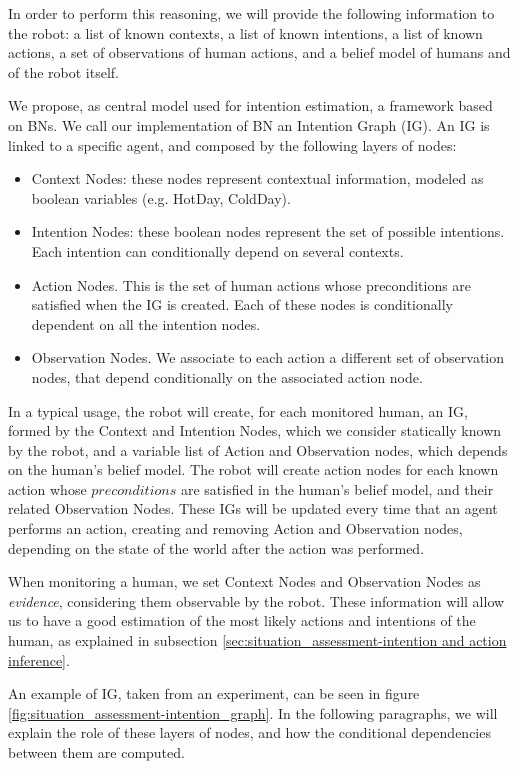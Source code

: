 In order to perform this reasoning, we will provide the following information to the robot: a list of known contexts, a list of known intentions, a list of known actions, a set of observations of human actions, and a belief model of humans and of the robot itself.

We propose, as central model used for intention estimation, a framework based on BNs. We call our implementation of BN an Intention Graph (IG).
An IG is linked to a specific agent, and composed by the following layers of nodes:
\begin{itemize}
\item Context Nodes: these nodes represent contextual information, modeled as boolean variables (e.g. HotDay, ColdDay).
\item Intention Nodes: these boolean nodes represent the set of possible intentions. Each intention can conditionally depend on several contexts.
\item Action Nodes. This is the set of human actions whose preconditions are satisfied when the IG is created. Each of these nodes is conditionally dependent on all the intention nodes. 
\item Observation Nodes. We associate to each action a different set of observation nodes, that depend conditionally on the associated action node. 
\end{itemize}

In a typical usage, the robot will create, for each monitored human, an IG, formed by the Context and Intention Nodes, which we consider statically known by the robot, and a variable list of Action and Observation nodes, which depends on the human's belief model. The robot will create action nodes for each known action whose $preconditions$ are satisfied in the human's belief model, and their related Observation Nodes. These IGs will be updated every time that an agent performs an action, creating and removing Action and Observation nodes, depending on the state of the world after the action was performed.

When monitoring a human, we set Context Nodes and Observation Nodes as \textit{evidence}, considering them observable by the robot. These information will allow us to have a good estimation of the most likely actions and intentions of the human, as explained in subsection \ref{sec:situation_assessment-intention and action inference}. 


An example of IG, taken from an experiment, can be seen in figure \ref{fig:situation_assessment-intention_graph}. In the following paragraphs, we will explain the role of these layers of nodes, and how the conditional dependencies between them are computed.

